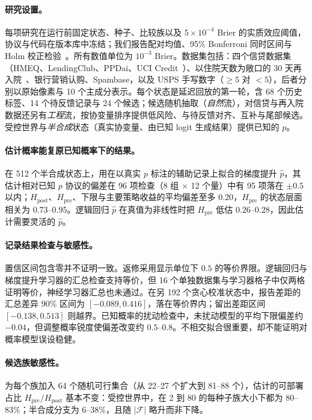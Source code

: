 \documentclass[runningheads]{llncs}
\begin{document}
\paragraph{研究设置。}每项研究在运行前固定状态、种子、比较族以及 $5\times10^{-4}$ Brier 的实质效应阈值，协议与代码在版本库中冻结；我们报告配对均值、95\% Bonferroni 同时区间与 Holm 校正检验~\cite{holm1979simple}。所有数值单位为 $10^{-3}$ Brier。数据集包括：四个信贷数据集（HMEQ、LendingClub、PPDai、UCI Credit~\cite{sasHMEQ,lendingclubSource,ppdaiSource,he2018ensemble,yeh2009comparison}）、以住院天数为敞口的 30 天再入院~\cite{strack2014impact}、银行营销认购、Spambase，以及 USPS 手写数字（$\ge5$ 对 $<5$），后者分别以原始像素与 10 个主成分表示。每个状态是延迟回放的第一轮，含 68 个历史标签、14 个待反馈记录与 24 个候选；候选随机抽取（\emph{自然}流），对信贷与再入院数据还另有\emph{工程}流，按协变量排序提供低风险、与待反馈对齐、互补与尾部候选。受控世界与\emph{半合成}状态（真实协变量、由已知 logit 生成结果）提供已知的 $p$。

\paragraph{估计概率能复原已知概率下的结果。}在 512 个半合成状态上，用在以真实 $p$ 标注的辅助记录上拟合的梯度提升 $\hat p$，其估计相对已知 $p$ 协议的偏差在 96 项检查（8 组 $\times$ 12 个量）中有 95 项落在 $\pm0.5$ 以内；$H_{\mathrm{post}}$、$H_{\mathrm{pre}}$、下限与主要策略收益的平均偏差至多 $0.20$，$H_{\mathrm{pre}}$ 的状态层面相关为 $0.73$--$0.95$。逻辑回归 $\hat p$ 在真值为非线性时把 $H_{\mathrm{pre}}$ 低估 $0.26$--$0.28$，因此估计需要灵活的 $\hat p$。

\paragraph{记录结果检查与敏感性。}置信区间包含零并不证明一致。返修采用显示单位下 $0.5$ 的等价界限。逻辑回归与梯度提升学习器的汇总检查支持等价，但 16 个单独数据集与学习器格子中仅两格证明等价，神经学习器汇总也未通过。在另 192 个贪心校准状态中，报告差距的汇总差异 90\% 区间为 $[-0.089,0.416]$，落在等价界内；留出差距区间 $[-0.138,0.513]$ 则越界。已知概率的扰动检查中，未扰动模型的平均下限偏差约 $-0.04$，但调整概率锐度使偏差改变约 $0.5$--$0.8$。不相交拟合很重要，却不能证明对概率模型误设稳健。

\paragraph{候选族敏感性。}为每个族加入 64 个随机可行集合（从 22--27 个扩大到 81--88 个），估计的可部署占比 $H_{\mathrm{pre}}/H_{\mathrm{post}}$ 基本不变：受控世界中，在 2 到 80 的每种子族大小下都为 80--83\%；半合成分支为 6--38\%，且随 $|\mathcal F|$ 略升而非下降。
\end{document}
